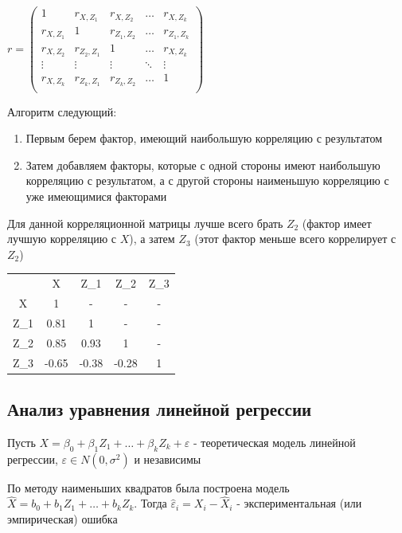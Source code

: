 \documentclass[12pt]{article}
\begin{document}
$r = \begin{pmatrix}
    1 & r_{X, Z_1} & r_{X, Z_2} & \dots & r_{X, Z_k} \\ 
    r_{X, Z_1} & 1 & r_{Z_1, Z_2} & \dots & r_{Z_1, Z_k} \\ 
    r_{X, Z_2} & r_{Z_2, Z_1} & 1 & \dots & r_{X, Z_k} \\ 
    \vdots & \vdots & \vdots & \ddots & \vdots \\ 
    r_{X, Z_k} & r_{Z_k, Z_1} & r_{Z_k, Z_2} & \dots & 1 \\ 
\end{pmatrix}$

\smallvspace

Алгоритм следующий: 

\begin{enumerate}
    \item Первым берем фактор, имеющий наибольшую корреляцию с результатом
    \item Затем добавляем факторы, которые с одной стороны имеют наибольшую корреляцию с результатом, а с другой стороны наименьшую корреляцию с уже имеющимися факторами
\end{enumerate}

\Ex Для данной корреляционной матрицы лучше всего брать $Z_2$ (фактор имеет лучшую корреляцию с $X$), 
а затем $Z_3$ (этот фактор меньше всего коррелирует с $Z_2$)

\begin{tabular}{c|c|c|c|c}
    & X & Z_1 & Z_2 & Z_3 \\
    X & 1 & - & - & - \\
    Z_1 & 0.81 & 1 & - & - \\
    Z_2 & 0.85 & 0.93 & 1 & - \\
    Z_3 & -0.65 & -0.38 & -0.28 & 1
\end{tabular}

\subsection{Анализ уравнения линейной регрессии}

Пусть $X = \beta_0 + \beta_1 Z_1 + \dots + \beta_k Z_k + \varepsilon$ - теоретическая модель линейной регрессии, $\varepsilon \in N(0, \sigma^2)$ и независимы

По методу наименьших квадратов была построена модель $\hat X = b_0 + b_1 Z_1 + \dots + b_k Z_k$. Тогда $\hat \varepsilon_i = X_i - \hat X_i$ - экспериментальная (или эмпирическая) ошибка
\end{document}
